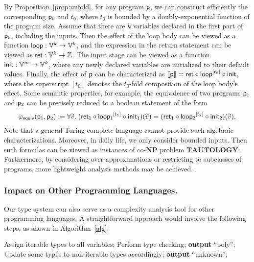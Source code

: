 \documentclass[runningheads]{llncs}
\begin{document}
By Proposition~\ref{prop:unfold}, for any program $\mathsf{p}$, we can construct efficiently the corresponding $\mathsf{p}_0$ and $t_0$, where $t_0$ is bounded by a doubly-exponential function of the program size.
Assume that there are $k$ variables declared in the first part of $\mathsf{p}_0$, including the inputs.
Then the effect of the loop body can be viewed as a function $\mathsf{loop}:\mathbb{V}^k\to \mathbb{V}^k$, and the expression in the return statement can be viewed as $\mathsf{ret}:\mathbb{V}^k\to\mathbb{Z}$.
The input stage can be viewed as a function $\mathsf{init}:\mathbb{V}^m \to \mathbb{V}^k$, where any newly declared variables are initialized to their default values.
Finally, the effect of $\mathsf{p}$ can be characterized as $\llbracket\mathsf{p}\rrbracket_{}=\mathsf{ret}\circ \mathsf{loop}^{[t_0]}\circ \mathsf{init}$, where the superscript $[t_0]$ denotes the $t_0$-fold composition of the loop body's effect. 
Some semantic properties, for example, the equivalence of two programs $\mathsf{p}_1$ and $\mathsf{p}_2$ can be precisely reduced to a boolean statement of the form
\begin{equation}
    \varphi_{\mathsf{equiv}}(\mathsf{p}_1,\mathsf{p}_2):=\forall \widetilde{v}.\;(\mathsf{ret_1}\circ \mathsf{loop_1}^{[t_1]}\circ \mathsf{init_1}) (\widetilde{v})=(\mathsf{ret_1}\circ \mathsf{loop_2}^{[t_2]}\circ \mathsf{init_2}) (\widetilde{v}).
\end{equation}
Note that a general Turing-complete language cannot provide such algebraic characterizations.
Moreover, in daily life, we only consider bounded inputs.
Then such formulas can be viewed as instances of co-$\mathbf{NP}$ problem $\mathbf{TAUTOLOGY}$. 
Furthermore, by considering over-approximations or restricting to subclasses of programs, more lightweight analysis methods may be achieved.

\subsubsection{Impact on Other Programming Languages.}
Our type system can also serve as a complexity analysis tool for other programming languages.
A straightforward approach would involve the following steps, as shown in Algorithm~\ref{alg}.

\begin{algorithm}[ht]
\caption{A simple complexity analysis procedure}
\begin{algorithmic}[1]\label{alg}
    \STATE Assign iterable types to all variables;
    \REPEAT
        \STATE Perform type checking;
            \STATE \textbf{output} ``poly''; \RETURN
        \ELSE
            \STATE Update some types to non-iterable types accordingly;
        \ENDIF
    \STATE \textbf{output} ``unknown'';
\end{algorithmic}
\end{algorithm}
\end{document}
